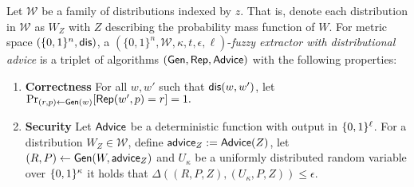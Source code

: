 \begin{definition}
\label{def:fe distributional}
Let $\mathcal{W}$ be a family of distributions indexed by $z$.  That is, denote each distribution in $\mathcal{W}$ as $W_Z$ with $Z$ describing the probability mass function of $W$.  
For metric space $(\{0,1\}^n, \mathsf{dis})$, a $(\{0,1\}^n, \mathcal{W}, \kappa, t, \epsilon, \ell)$-\emph{fuzzy extractor with distributional advice} is a triplet of algorithms $({\mathsf{Gen}}, {\mathsf{Rep}}, {\mathsf{Advice}})$ with the following properties:
\begin{enumerate} 
\itemsep0em
\item \textbf{Correctness} For all $w, w'$ such that $\mathsf{dis}(w, w')$, let $\Pr_{(r, p) \leftarrow {\ensuremath{\mathsf{Gen}}}(w)}[{\mathsf{Rep}}(w', p) = r]=1.$
\item \textbf{Security} Let ${\mathsf{Advice}}$ be a deterministic function with output in $\{0, 1\}^\ell$.  For a distribution $W_Z \in \mathcal{W}$, define ${\mathsf{advice}}_Z:= {\mathsf{Advice}}(Z)$, let $(R, P) \leftarrow {\ensuremath{\mathsf{Gen}}}(W, {\mathsf{advice}}_Z)$ and $U_\kappa$ be a uniformly distributed random variable over $\{0, 1\}^\kappa$ it holds that $\Delta((R, P, Z), (U_\kappa, P, Z))\le \epsilon.$
\end{enumerate}
\end{definition}

